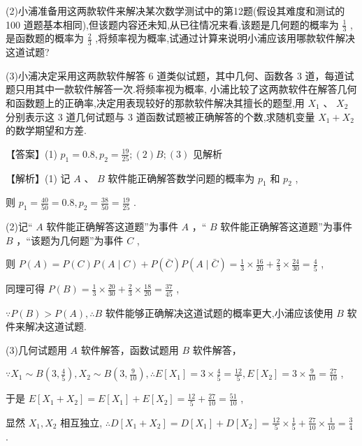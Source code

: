 \documentclass[10pt]{article}
\begin{document}
(2)小浦准备用这两款软件来解决某次数学测试中的第12题(假设其难度和测试的 100 道题基本相同),但该题内容还未知,从已往情况来看,该题是几何题的概率为 \(\frac{1}{3}\) ,是函数题的概率为 \(\frac{2}{3}\) ,将频率视为概率,试通过计算来说明小浦应该用哪款软件解决这道试题?

(3)小浦决定采用这两款软件解答 6 道类似试题，其中几何、函数各 3 道，每道试题只用其中一款软件解答一次.将频率视为概率, 小浦比较了这两款软件在解答几何和函数题上的正确率,决定用表现较好的那款软件解决其擅长的题型,用 \({X}_{1}\text{ 、 }{X}_{2}\) 分别表示这 3 道几何试题与 3 道函数试题被正确解答的个数,求随机变量 \({X}_{1} + {X}_{2}\) 的数学期望和方差.

【答案】(1) \({p}_{1} = {0.8},{p}_{2} = \frac{19}{25};\left( 2\right) B;\left( 3\right)\) 见解析

【解析】(1) 记 \(A\) 、 \(B\) 软件能正确解答数学问题的概率为 \({p}_{1}\) 和 \({p}_{2}\) ,

则 \({p}_{1} = \frac{40}{50} = {0.8},{p}_{2} = \frac{38}{50} = \frac{19}{25}\) .

(2)记“ \(A\) 软件能正确解答这道题”为事件 \(A\) ，“ \(B\) 软件能正确解答这道题”为事件 \(B\) ，“该题为几何题”为事件 \(C\) ,

则 \(P\left( A\right)  = P\left( C\right) P\left( {A \mid  C}\right)  + P\left( \bar{C}\right) P\left( {A \mid  \bar{C}}\right)  = \frac{1}{3} \times  \frac{16}{20} + \frac{2}{3} \times  \frac{24}{30} = \frac{4}{5}\) ,

同理可得 \(P\left( B\right)  = \frac{1}{3} \times  \frac{20}{30} + \frac{2}{3} \times  \frac{18}{20} = \frac{37}{45}\) ,

\(\because P\left( B\right)  > P\left( A\right) ,\therefore B\) 软件能够正确解决这道试题的概率更大,小浦应该使用 \(B\) 软件来解决这道试题.

(3)几何试题用 \(A\) 软件解答，函数试题用 \(B\) 软件解答，

\(\because {X}_{1} \sim  B\left( {3,\frac{4}{5}}\right) ,{X}_{2} \sim  B\left( {3,\frac{9}{10}}\right) ,\therefore E\left\lbrack  {X}_{1}\right\rbrack   = 3 \times  \frac{4}{5} = \frac{12}{5},E\left\lbrack  {X}_{2}\right\rbrack   = 3 \times  \frac{9}{10} = \frac{27}{10}\) ,

于是 \(E\left\lbrack  {{X}_{1} + {X}_{2}}\right\rbrack   = E\left\lbrack  {X}_{1}\right\rbrack   + E\left\lbrack  {X}_{2}\right\rbrack   = \frac{12}{5} + \frac{27}{10} = \frac{51}{10}\) ,

显然 \({X}_{1},{X}_{2}\) 相互独立, \(\therefore D\left\lbrack  {{X}_{1} + {X}_{2}}\right\rbrack   = D\left\lbrack  {X}_{1}\right\rbrack   + D\left\lbrack  {X}_{2}\right\rbrack   = \frac{12}{5} \times  \frac{1}{5} + \frac{27}{10} \times  \frac{1}{10} = \frac{3}{4}\) .
\end{document}
